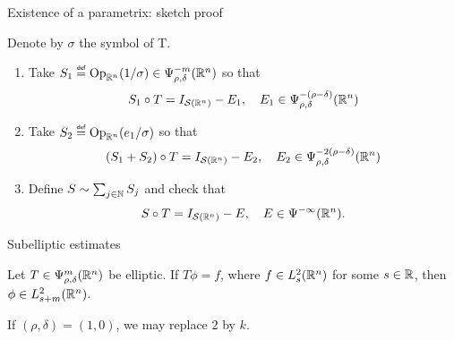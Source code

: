 \documentclass{beamer}
\begin{document}
\begin{frame}
    {Existence of a parametrix: sketch proof}

    \pause
    Denote by $\sigma$ the symbol of T.
    \begin{enumerate}
        \item Take $S_1 \defeq \Op(1 / \sigma) \in \OperatorClass {-m} {\rho, \delta}$ so that
            \begin{align*}
                S_1 \circ T = {I_{{\mathcal{S} (\mathbb{R}^n)}}} - E_1,
                \quad E_1 \in \Psi^{-(\rho - \delta)}_{\rho, \delta}(\mathbb{R}^n)
            \end{align*}
            \pause
        \item Take $S_2 \defeq \Op(e_1/\sigma)$ so that
            \begin{align*}
                (S_1 + S_2) \circ T = {I_{{\mathcal{S} (\mathbb{R}^n)}}} - E_2,
                \quad E_2 \in \Psi^{-2(\rho - \delta)}_{\rho, \delta}(\mathbb{R}^n)
            \end{align*}
            \pause
        \item Define $S \sim \sum_{j \in \mathbb{N}} S_j$ and check that
            \begin{align*}
                S \circ T = {I_{{\mathcal{S} (\mathbb{R}^n)}}} - E,
                \quad E \in {\Psi^{-\infty} (\mathbb{R}^n)}.
            \end{align*}
    \end{enumerate}
\end{frame}

\begin{frame}
    {Subelliptic estimates}

    \begin{theorem}
        Let $T \in \Psi^{m}_{\rho, \delta}(\mathbb{R}^n)$ be elliptic.
        If $T \phi = f$,
        where $f \in L^2_{s}(\mathbb{R}^n)$ for some $s \in \mathbb{R}$,
        then $\phi \in L^2_{s + m}(\mathbb{R}^n)$.

        If $(\rho, \delta) = (1, 0)$,
        we may replace $2$ by $k$.
    \end{theorem}
\end{frame}
\end{document}
